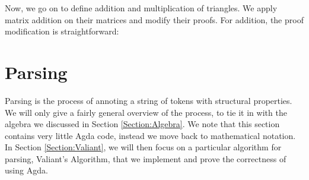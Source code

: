 \documentclass{article}
\newcommand{\Conid}[1]{\mathit{#1}}
\newcommand{\Varid}[1]{\mathit{#1}}
\def\resethooks{%
  \global\let\SaveRestoreHook\empty
  \global\let\ColumnHook\empty}
\newcommand{\hsindent}[1]{\quad}%
\let\hspre\empty
\let\hspost\empty
\renewcommand\Varid[1]{\mathord{\textsf{#1}}}
\let\Conid\Varid
\newcommand\Keyword[1]{\textsf{\textbf{#1}}}
\begin{document}
Now, we go on to define addition and multiplication of triangles. We apply matrix addition on their matrices and modify their proofs. For addition, the proof modification is straightforward: 
\resethooks


\newcommand{\productions}{P}
\newcommand{\nonterminals}{N}
\newcommand{\terminals}{T}
\newcommand{\startsymbol}{S}
\newcommand{\grammar}{(\nonterminals, \terminals, \productions, \startsymbol)}
\section{Parsing}
Parsing is the process of annoting a string of tokens with structural properties. We will only give a fairly general overview of the process, to tie it in with the algebra we discussed in Section \ref{Section:Algebra}. We note that this section contains  very little Agda code, instead we move back to mathematical notation. In Section \ref{Section:Valiant}, we will then focus on a particular algorithm for parsing, Valiant's Algorithm, that we implement and prove the correctness of using Agda.
\end{document}
